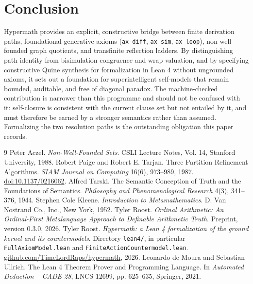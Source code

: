 \documentclass[11pt]{article}
\theoremstyle{definition}
\begin{document}
\section{Conclusion}
Hypermath provides an explicit, constructive bridge between finite derivation paths, foundational generative axioms (\texttt{ax-diff}, \texttt{ax-sim}, \texttt{ax-loop}), non-well-founded graph quotients, and transfinite reflection ladders. By distinguishing path identity from bisimulation congruence and wrap valuation, and by specifying constructive Quine synthesis for formalization in Lean 4 without ungrounded axioms, it sets out a foundation for superintelligent self-models that remain bounded, auditable, and free of diagonal paradox. The machine-checked contribution is narrower than this programme and should not be confused with it: self-closure is consistent with the current clause set but not entailed by it, and must therefore be earned by a stronger semantics rather than assumed. Formalizing the two resolution paths is the outstanding obligation this paper records.

\begin{thebibliography}{9}
\small
{} Peter Aczel. \emph{Non-Well-Founded Sets}. CSLI Lecture Notes, Vol. 14, Stanford University, 1988.
 Robert Paige and Robert E. Tarjan. Three Partition Refinement Algorithms. \emph{SIAM Journal on Computing} 16(6), 973--989, 1987. \href{https://doi.org/10.1137/0216062}{doi:10.1137/0216062}.
 Alfred Tarski. The Semantic Conception of Truth and the Foundations of Semantics. \emph{Philosophy and Phenomenological Research} 4(3), 341--376, 1944.
 Stephen Cole Kleene. \emph{Introduction to Metamathematics}. D. Van Nostrand Co., Inc., New York, 1952.
 Tyler Roost. \emph{Ordinal Arithmetic: An Ordinal-First Metalanguage Approach to Definable Arithmetic Truth}. Preprint, version 0.3.0, 2026.
 Tyler Roost. \emph{Hypermath: a Lean 4 formalization of the ground kernel and its countermodels}. Directory \texttt{lean4/}, in particular \texttt{FullAxiomModel.lean} and \texttt{FiniteActionCountermodel.lean}. \href{https://github.com/TimeLordRaps/hypermath}{github.com/TimeLordRaps/hypermath}, 2026.
 Leonardo de Moura and Sebastian Ullrich. The Lean 4 Theorem Prover and Programming Language. In \emph{Automated Deduction -- CADE 28}, LNCS 12699, pp. 625--635, Springer, 2021.
\end{thebibliography}
\end{document}
